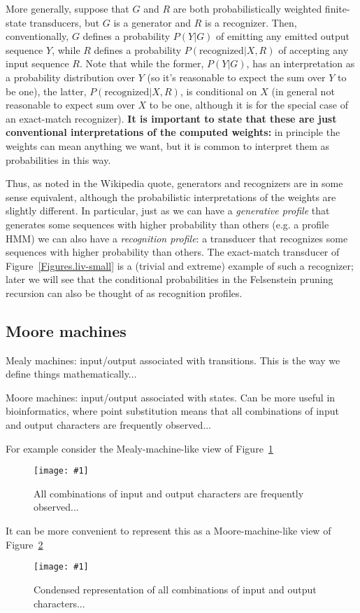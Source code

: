 \documentclass{article}
\newcommand{\figref}[1]{Figure~\ref{Figures.#1}}
\newcommand{\figlabel}[1]{\label{Figures.#1}}
\newcommand{\easyfig}[4]{
\begin{figure}
\texttt{[image: \#1]}
\caption{ \figlabel{#3} #4}
\end{figure}}
\newcommand{\widepngfig}[2]{\easyfig{#1.png}{width=\textwidth}{#1}{#2}}
\begin{document}
More generally, suppose that $G$ and $R$ are both probabilistically weighted finite-state transducers,
but $G$ is a generator and $R$ is a recognizer.
Then, conventionally, $G$ defines a probability $P(Y|G)$ of emitting any emitted output sequence $Y$,
while $R$ defines a probability $P(\mbox{recognized}|X,R)$ of accepting any input sequence $R$.
Note that while the former, $P(Y|G)$, has an interpretation as a probability distribution over $Y$
(so it's reasonable to expect the sum over $Y$ to be one),
the latter, $P(\mbox{recognized}|X,R)$, is conditional on $X$
(in general not reasonable to expect sum over $X$ to be one,
although it is for the special case of an exact-match recognizer).
{\bf It is important to state that these are just conventional interpretations of the computed weights:}
in principle the weights can mean anything we want,
but it is common to interpret them as probabilities in this way.

Thus, as noted in the Wikipedia quote, generators and recognizers are in some sense equivalent,
although the probabilistic interpretations of the weights are slightly different.
In particular, just as we can have a {\em generative profile}
that generates some sequences with higher probability than others (e.g. a profile HMM)
we can also have a {\em recognition profile}: a transducer
that recognizes some sequences with higher probability than others.
The exact-match transducer of \figref{liv-small} is a (trivial and extreme) example of such a recognizer;
later we will see that the conditional probabilities in the Felsenstein pruning recursion can also
be thought of as recognition profiles.

\subsection{Moore machines}

Mealy machines: input/output associated with transitions.
This is the way we define things mathematically...

Moore machines: input/output associated with states.
Can be more useful in bioinformatics,
where point substitution means that all combinations of input and output characters are frequently observed...

For example consider the Mealy-machine-like view of \figref{fanned-emission}
\widepngfig{fanned-emission}{All combinations of input and output characters are frequently observed...}

It can be more convenient to represent this as a Moore-machine-like view of \figref{condensed-emission}
\widepngfig{condensed-emission}{Condensed representation of all combinations of input and output characters...}
\end{document}
